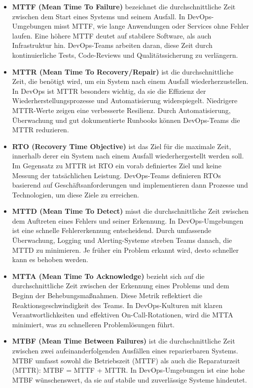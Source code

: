 \begin{itemize}
    \item \textbf{MTTF (Mean Time To Failure)} bezeichnet die durchschnittliche Zeit zwischen
    dem Start eines Systems und seinem Ausfall. In DevOps-Umgebungen misst MTTF, wie lange
    Anwendungen oder Services ohne Fehler laufen. Eine höhere MTTF deutet auf stabilere Software,
    als auch Infrastruktur hin. DevOps-Teams arbeiten daran, diese Zeit durch kontinuierliche Tests,
    Code-Reviews und Qualitätssicherung zu verlängern.
    
    \item \textbf{MTTR (Mean Time To Recovery/Repair)} ist die durchschnittliche Zeit, die benötigt
    wird, um ein System nach einem Ausfall wiederherzustellen. In DevOps ist MTTR besonders wichtig,
    da sie die Effizienz der Wiederherstellungsprozesse und Automatisierung widerspiegelt.
    Niedrigere MTTR-Werte zeigen eine verbesserte Resilienz. Durch Automatisierung, Überwachung und
    gut dokumentierte Runbooks können DevOps-Teams die MTTR reduzieren.
    
    \item \textbf{RTO (Recovery Time Objective)} ist das Ziel für die maximale Zeit, innerhalb
    derer ein System nach einem Ausfall wiederhergestellt werden soll. Im Gegensatz zu MTTR ist
    RTO ein vorab definiertes Ziel und keine Messung der tatsächlichen Leistung. DevOps-Teams
    definieren RTOs basierend auf Geschäftsanforderungen und implementieren dann Prozesse und
    Technologien, um diese Ziele zu erreichen.
    
    \item \textbf{MTTD (Mean Time To Detect)} misst die durchschnittliche Zeit zwischen dem
    Auftreten eines Fehlers und seiner Erkennung. In DevOps-Umgebungen ist eine schnelle
    Fehlererkennung entscheidend. Durch umfassende Überwachung, Logging und Alerting-Systeme
    streben Teams danach, die MTTD zu minimieren. Je früher ein Problem erkannt wird, desto
    schneller kann es behoben werden.
    
    \item \textbf{MTTA (Mean Time To Acknowledge)} bezieht sich auf die durchschnittliche Zeit
    zwischen der Erkennung eines Problems und dem Beginn der Behebungsmaßnahmen. Diese Metrik
    reflektiert die Reaktionsgeschwindigkeit des Teams. In DevOps-Kulturen mit klaren
    Verantwortlichkeiten und effektiven On-Call-Rotationen, wird die MTTA minimiert,
    was zu schnelleren Problemlösungen führt.
    
    \item \textbf{MTBF (Mean Time Between Failures)} ist die durchschnittliche Zeit zwischen zwei
    aufeinanderfolgenden Ausfällen eines reparierbaren Systems. MTBF umfasst sowohl die Betriebszeit
    (MTTF) als auch die Reparaturzeit (MTTR): MTBF = MTTF + MTTR. In DevOps-Umgebungen ist eine hohe
    MTBF wünschenswert, da sie auf stabile und zuverlässige Systeme hindeutet.
\end{itemize}
\cite{echolon_mttr,alertops_metrics}




